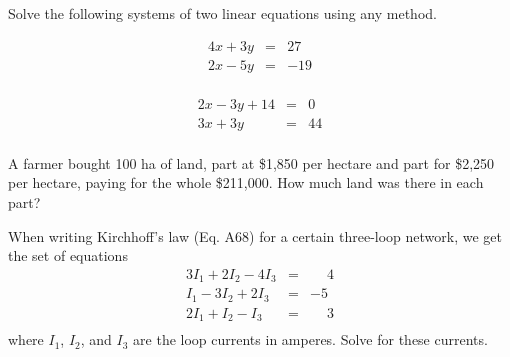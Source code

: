 \documentclass[12pt,letterpaper]{orulawork}
\newif\ifanswerkey
\newcommand{\answer}[1]{%
	\ifanswerkey%
		{\color{red}[Ans: #1]}%
	\fi%
}
\begin{document}


\begin{question}
Solve the following systems of two linear equations using any method.
\begin{exercises}
	\item%
	\begin{eqnarray*}
		4x + 3y & = & 27 \\
		2x - 5y & = & -19 \\
	\end{eqnarray*} \answer{$x=3$ and $y=5$}
	\item%
	\begin{eqnarray*}
		2x - 3y + 14 & = & 0 \\
		3x + 3y & = & 44 \\
	\end{eqnarray*} \answer{$x=6$ and $y=\frac{26}{3}$}
\end{exercises}
\end{question}

\begin{question}
	A farmer bought 100 ha of land, part at \$1,850 per hectare and part for \$2,250 per hectare, paying for the whole \$211,000. How much land was there in each part? \answer{$x=35$ and $y=65$ or $x=65$ and $y=35$}
\end{question}

\begin{question}
	When writing Kirchhoff’s law (Eq. A68) for a certain three-loop network, we get the set of equations
	\begin{eqnarray*}
		3I_1 + 2I_2 - 4I_3 & = & \phantom{-}4 \\
		I_1 - 3I_2 + 2I_3 & = & -5 \\
		2I_1 + I_2 - I_3 & = & \phantom{-}3 \\
	\end{eqnarray*}
where $I_1$, $I_2$, and $I_3$ are the loop currents in amperes. Solve for these currents. \answer{$I_1=\frac{2}{3}$, $I_2=\frac{7}{3}$ and $I_3=\frac{2}{3}$}
\end{question}

\pagebreak
\end{document}
